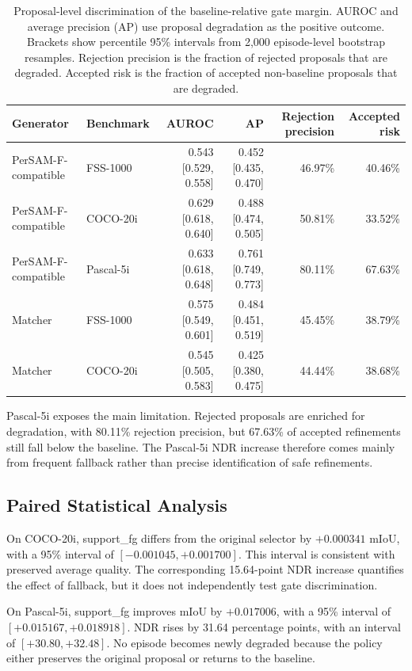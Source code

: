 \documentclass{CVM}
\begin{document}
\begin{table}[h!t]
\center
\caption{Proposal-level discrimination of the baseline-relative gate margin. AUROC and average precision (AP) use proposal degradation as the positive outcome. Brackets show percentile 95\% intervals from 2,000 episode-level bootstrap resamples. Rejection precision is the fraction of rejected proposals that are degraded. Accepted risk is the fraction of accepted non-baseline proposals that are degraded.}
\begin{tabular}{llrrrr}
\toprule
Generator & Benchmark & AUROC & AP & Rejection precision & Accepted risk \\
\midrule
PerSAM-F-compatible & FSS-1000 & 0.543 [0.529, 0.558] & 0.452 [0.435, 0.470] & 46.97\% & 40.46\% \\
PerSAM-F-compatible & COCO-20i & 0.629 [0.618, 0.640] & 0.488 [0.474, 0.505] & 50.81\% & 33.52\% \\
PerSAM-F-compatible & Pascal-5i & 0.633 [0.618, 0.648] & 0.761 [0.749, 0.773] & 80.11\% & 67.63\% \\
Matcher & FSS-1000 & 0.575 [0.549, 0.601] & 0.484 [0.451, 0.519] & 45.45\% & 38.79\% \\
Matcher & COCO-20i & 0.545 [0.505, 0.583] & 0.425 [0.380, 0.475] & 44.44\% & 38.68\% \\
\bottomrule
\end{tabular}
\label{tab:discrimination}
\end{table}

Pascal-5i exposes the main limitation. Rejected proposals are enriched for degradation, with 80.11\% rejection precision, but 67.63\% of accepted refinements still fall below the baseline. The Pascal-5i NDR increase therefore comes mainly from frequent fallback rather than precise identification of safe refinements.

\subsection{Paired Statistical Analysis}

On COCO-20i, support\_fg differs from the original selector by $+0.000341$ mIoU, with a 95\% interval of $[-0.001045,+0.001700]$. This interval is consistent with preserved average quality. The corresponding 15.64-point NDR increase quantifies the effect of fallback, but it does not independently test gate discrimination.

On Pascal-5i, support\_fg improves mIoU by $+0.017006$, with a 95\% interval of $[+0.015167,+0.018918]$. NDR rises by 31.64 percentage points, with an interval of $[+30.80,+32.48]$. No episode becomes newly degraded because the policy either preserves the original proposal or returns to the baseline.
\end{document}
